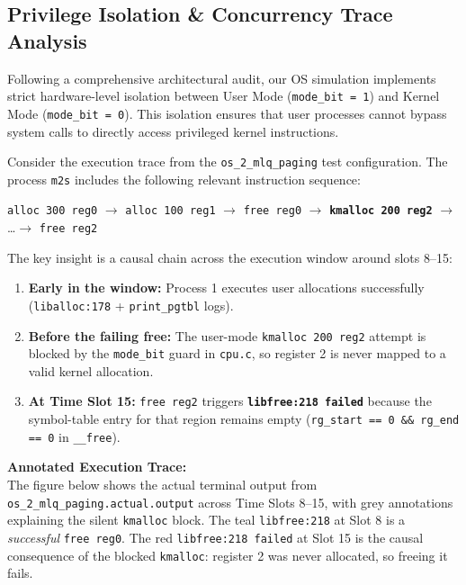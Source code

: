 \subsection{Privilege Isolation \& Concurrency Trace Analysis}
Following a comprehensive architectural audit, our OS simulation implements strict hardware-level isolation between User Mode (\texttt{mode\_bit = 1}) and Kernel Mode (\texttt{mode\_bit = 0}). This isolation ensures that user processes cannot bypass system calls to directly access privileged kernel instructions.

Consider the execution trace from the \texttt{os\_2\_mlq\_paging} test configuration. The process \texttt{m2s} includes the following relevant instruction sequence:

\begin{center}
\texttt{alloc 300 reg0} $\to$ \texttt{alloc 100 reg1} $\to$ \texttt{free reg0} $\to$ \textbf{\texttt{kmalloc 200 reg2}} $\to$ \ldots $\to$ \texttt{free reg2}
\end{center}

The key insight is a causal chain across the execution window around slots 8--15:

\begin{enumerate}
    \item \textbf{Early in the window:} Process 1 executes user allocations successfully (\texttt{liballoc:178} + \texttt{print\_pgtbl} logs).
    \item \textbf{Before the failing free:} The user-mode \texttt{kmalloc 200 reg2} attempt is blocked by the \texttt{mode\_bit} guard in \texttt{cpu.c}, so register 2 is never mapped to a valid kernel allocation.
    \item \textbf{At Time Slot 15:} \texttt{free reg2} triggers \texttt{\textbf{libfree:218 failed}} because the symbol-table entry for that region remains empty (\texttt{rg\_start == 0 \&\& rg\_end == 0} in \texttt{\_\_free}).
\end{enumerate}

\textbf{Annotated Execution Trace:}\\
The figure below shows the actual terminal output from \texttt{os\_2\_mlq\_paging.actual.output} across Time Slots 8--15, with grey annotations explaining the silent \texttt{kmalloc} block. The teal \texttt{libfree:218} at Slot 8 is a \textit{successful} \texttt{free reg0}. The red \texttt{libfree:218 failed} at Slot 15 is the causal consequence of the blocked \texttt{kmalloc}: register 2 was never allocated, so freeing it fails.

